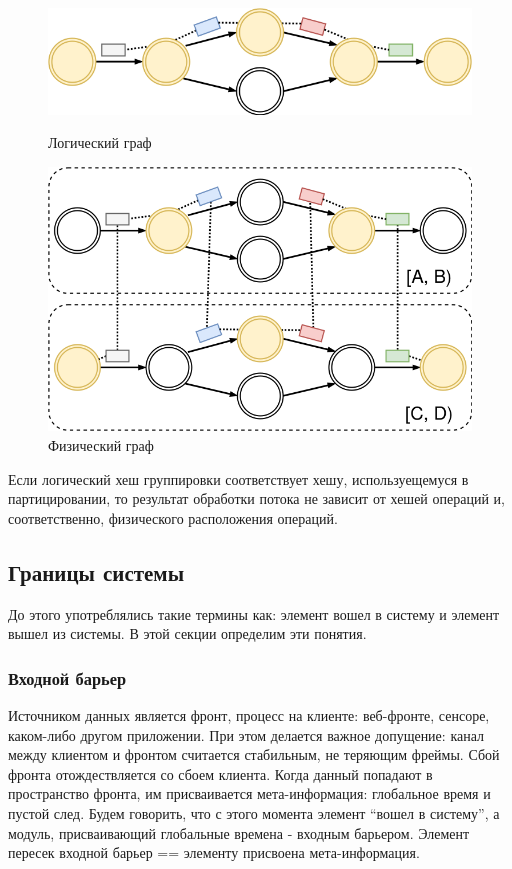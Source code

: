 \documentclass[14pt]{matmex-diploma-custom}
\begin{document}
\begin{figure}
  \centering
	\includegraphics[width=1.0\textwidth]{pics/logical.png}
	\caption{Логический граф}
	\includegraphics[width=1.0\textwidth]{pics/physical.png}
	\caption{Физический граф}
\end{figure}

Если логический хеш группировки соответствует хешу, используещемуся в партицировании, то результат обработки потока не зависит от хешей операций и, соответственно, физического расположения операций.

\subsection{Границы системы}

До этого употреблялись такие термины как: элемент вошел в систему и элемент вышел из системы. В этой секции определим эти понятия.

\subsubsection{Входной барьер}

Источником данных является фронт, процесс на клиенте: веб-фронте, сенсоре, каком-либо другом приложении. При этом делается важное допущение: канал между клиентом и фронтом считается стабильным, не теряющим фреймы. Сбой фронта отождествляется со сбоем клиента. Когда данный попадают в пространство фронта, им присваивается мета-информация: глобальное время и пустой след. Будем говорить, что с этого момента элемент “вошел в систему”, а модуль, присваивающий глобальные времена - входным барьером. Элемент пересек входной барьер == элементу присвоена мета-информация.
\end{document}
